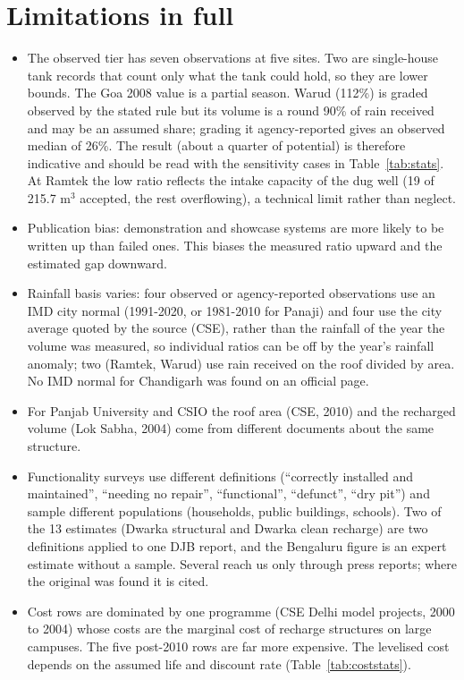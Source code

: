 \section{Limitations in full}
\begin{itemize}
\item The observed tier has seven observations at five sites. Two are single-house tank records that count only what the tank could hold, so they are lower bounds. The Goa 2008 value is a partial season. Warud (112\%) is graded observed by the stated rule but its volume is a round 90\% of rain received and may be an assumed share; grading it agency-reported gives an observed median of 26\%. The result (about a quarter of potential) is therefore indicative and should be read with the sensitivity cases in Table~\ref{tab:stats}. At Ramtek the low ratio reflects the intake capacity of the dug well (19 of 215.7 m$^3$ accepted, the rest overflowing), a technical limit rather than neglect.
\item Publication bias: demonstration and showcase systems are more likely to be written up than failed ones. This biases the measured ratio upward and the estimated gap downward.
\item Rainfall basis varies: four observed or agency-reported observations use an IMD city normal (1991-2020, or 1981-2010 for Panaji) and four use the city average quoted by the source (CSE), rather than the rainfall of the year the volume was measured, so individual ratios can be off by the year's rainfall anomaly; two (Ramtek, Warud) use rain received on the roof divided by area. No IMD normal for Chandigarh was found on an official page.
\item For Panjab University and CSIO the roof area (CSE, 2010) and the recharged volume (Lok Sabha, 2004) come from different documents about the same structure.
\item Functionality surveys use different definitions (``correctly installed and maintained'', ``needing no repair'', ``functional'', ``defunct'', ``dry pit'') and sample different populations (households, public buildings, schools). Two of the 13 estimates (Dwarka structural and Dwarka clean recharge) are two definitions applied to one DJB report, and the Bengaluru figure is an expert estimate without a sample. Several reach us only through press reports; where the original was found it is cited.
\item Cost rows are dominated by one programme (CSE Delhi model projects, 2000 to 2004) whose costs are the marginal cost of recharge structures on large campuses. The five post-2010 rows are far more expensive. The levelised cost depends on the assumed life and discount rate (Table~\ref{tab:coststats}).

\end{itemize}

